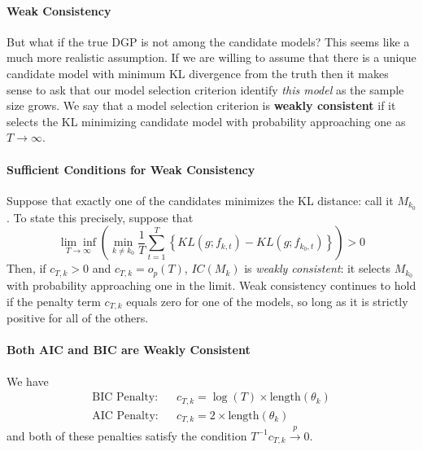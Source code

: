 \documentclass[12pt]{article}
\theoremstyle{definition}
\begin{document}
\paragraph{Weak Consistency} But what if the true DGP is not among the candidate models? This seems like a much more realistic assumption. If we are willing to assume that there is a unique candidate model with minimum KL divergence from the truth then it makes sense to ask that our model selection criterion identify \emph{this model} as the sample size grows. We say that a model selection criterion is \textbf{weakly consistent} if it selects the KL minimizing candidate model with probability approaching one as $T\rightarrow \infty$.


\paragraph{Sufficient Conditions for Weak Consistency}
Suppose that exactly one of the candidates minimizes the KL distance: call it $M_{k_0}$. To state this precisely, suppose that
	$$\underset{T\rightarrow \infty}{\lim\inf}\left(\underset{k \neq k_0}{\min} \frac{1}{T}\sum_{t = 1}^T \left\{ KL(g; f_{k,t}) - KL(g;f_{k_0,t}) \right\} \right) > 0$$
Then, if $c_{T,k}> 0$ and $c_{T,k} = o_p(T)$, $IC(M_k)$ is \emph{weakly consistent}: it selects $M_{k_0}$ with probability approaching one in the limit. Weak consistency continues to hold if the penalty term $c_{T,k}$ equals zero for one of the models, so long as it is strictly positive for all of the others.

\paragraph{Both AIC and BIC are Weakly Consistent}
We have
	\begin{eqnarray*}
		\mbox{BIC Penalty:}&& c_{T,k} = \log(T) \times \mbox{length}(\theta_k)\\
		\mbox{AIC Penalty:} && c_{T,k} = 2\times \mbox{length}(\theta_k)
	\end{eqnarray*}
and both of these penalties satisfy the condition $T^{-1}c_{T,k} \overset{p}{\rightarrow} 0$.
\end{document}
